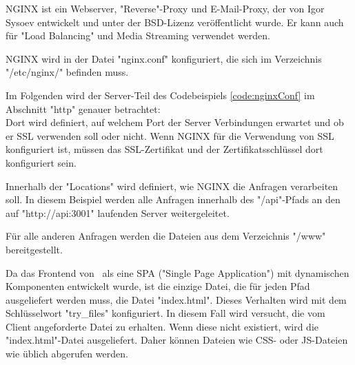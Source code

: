 

NGINX ist ein Webserver, "Reverse"-Proxy und E-Mail-Proxy, der von Igor Sysoev entwickelt und unter der BSD-Lizenz veröffentlicht wurde. 
Er kann auch für "Load Balancing" und Media Streaming verwendet werden.
\cite{WikiNginx}
\cite{nginx}

NGINX wird in der Datei "nginx.conf" konfiguriert, die sich im Verzeichnis \linebreak \mbox{\ttfamily "/etc/nginx/"} befinden muss. 


Im Folgenden wird der Server-Teil des Codebeispiels \ref{code:nginxConf} im Abschnitt "{\ttfamily http}" genauer betrachtet: \\
Dort wird definiert, auf welchem Port der Server Verbindungen erwartet und ob er SSL verwenden soll oder nicht. 
Wenn NGINX für die Verwendung von SSL konfiguriert ist, müssen das SSL-Zertifikat und der Zertifikatsschlüssel dort konfiguriert sein.

Innerhalb der "Locations" wird definiert, wie NGINX die Anfragen verarbeiten soll. In diesem Beispiel werden alle Anfragen innerhalb des "{\ttfamily /api}"-Pfads an den auf \mbox{"{\ttfamily http://api:3001}"} laufenden Server weitergeleitet.

Für alle anderen Anfragen werden die Dateien aus dem Verzeichnis "{\ttfamily /www}" bereitgestellt. 

Da das Frontend von \ZELIA\ als eine SPA ("Single Page Application") mit dynamischen Komponenten entwickelt wurde, ist die einzige Datei, die für jeden Pfad ausgeliefert werden muss, die Datei "{\ttfamily index.html}". 
Dieses Verhalten wird mit dem Schlüsselwort "{\ttfamily try\_files}" konfiguriert. 
In diesem Fall wird versucht, die vom Client angeforderte Datei zu erhalten. 
Wenn diese nicht existiert, wird die "{\ttfamily index.html}"-Datei ausgeliefert. 
Daher können Dateien wie CSS- oder JS-Dateien wie üblich abgerufen werden.

